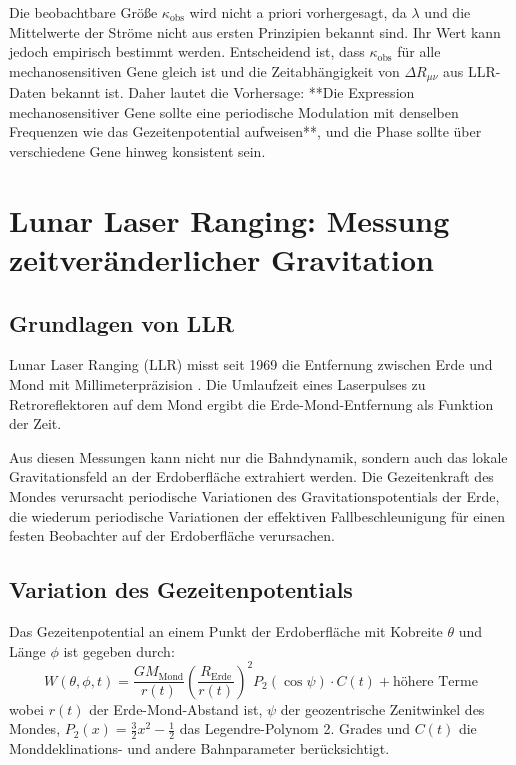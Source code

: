 \documentclass[12pt,a4paper]{article}
\theoremstyle{remark}
\begin{document}
	Die beobachtbare Größe \(\kappa_{\text{obs}}\) wird nicht a priori vorhergesagt, da \(\lambda\) und die Mittelwerte der Ströme nicht aus ersten Prinzipien bekannt sind. Ihr Wert kann jedoch empirisch bestimmt werden. Entscheidend ist, dass \(\kappa_{\text{obs}}\) für alle mechanosensitiven Gene gleich ist und die Zeitabhängigkeit von \(\Delta R_{\mu\nu}\) aus LLR-Daten bekannt ist. Daher lautet die Vorhersage: **Die Expression mechanosensitiver Gene sollte eine periodische Modulation mit denselben Frequenzen wie das Gezeitenpotential aufweisen**, und die Phase sollte über verschiedene Gene hinweg konsistent sein.
	
	\section{Lunar Laser Ranging: Messung zeitveränderlicher Gravitation}
	\label{sec:llr}
	
	\subsection{Grundlagen von LLR}
	
	Lunar Laser Ranging (LLR) misst seit 1969 die Entfernung zwischen Erde und Mond mit Millimeterpräzision \cite{LLR-IfE}. Die Umlaufzeit eines Laserpulses zu Retroreflektoren auf dem Mond ergibt die Erde-Mond-Entfernung als Funktion der Zeit.
	
	Aus diesen Messungen kann nicht nur die Bahndynamik, sondern auch das lokale Gravitationsfeld an der Erdoberfläche extrahiert werden. Die Gezeitenkraft des Mondes verursacht periodische Variationen des Gravitationspotentials der Erde, die wiederum periodische Variationen der effektiven Fallbeschleunigung für einen festen Beobachter auf der Erdoberfläche verursachen.
	
	\subsection{Variation des Gezeitenpotentials}
	
	Das Gezeitenpotential an einem Punkt der Erdoberfläche mit Kobreite \(\theta\) und Länge \(\phi\) ist gegeben durch:
	\begin{equation}
		W(\theta,\phi,t) = \frac{GM_{\text{Mond}}}{r(t)} \left(\frac{R_{\text{Erde}}}{r(t)}\right)^2 P_2(\cos\psi) \cdot C(t) + \text{höhere Terme}
		\label{eq:tidal-full}
	\end{equation}
	wobei \(r(t)\) der Erde-Mond-Abstand ist, \(\psi\) der geozentrische Zenitwinkel des Mondes, \(P_2(x)=\frac{3}{2}x^2-\frac12\) das Legendre-Polynom 2. Grades und \(C(t)\) die Monddeklinations- und andere Bahnparameter berücksichtigt.
	
\end{document}
